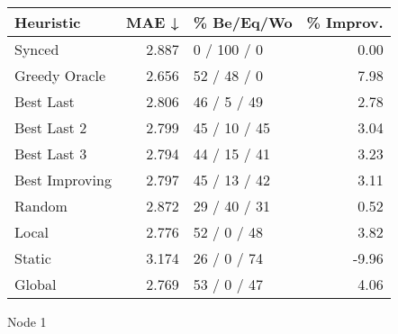 \begin{tabular}{lrlr}
\toprule
\textbf{Heuristic} & \textbf{MAE ↓} & \textbf{\% Be/Eq/Wo} & \textbf{\% Improv.} \\
\midrule
            Synced &          2.887 &          0 / 100 / 0 &                0.00 \\
     Greedy Oracle &          2.656 &          52 / 48 / 0 &                7.98 \\
         Best Last &          2.806 &          46 / 5 / 49 &                2.78 \\
       Best Last 2 &          2.799 &         45 / 10 / 45 &                3.04 \\
       Best Last 3 &          2.794 &         44 / 15 / 41 &                3.23 \\
    Best Improving &          2.797 &         45 / 13 / 42 &                3.11 \\
            Random &          2.872 &         29 / 40 / 31 &                0.52 \\
             Local &          2.776 &          52 / 0 / 48 &                3.82 \\
            Static &          3.174 &          26 / 0 / 74 &               -9.96 \\
            Global &          2.769 &          53 / 0 / 47 &                4.06 \\
\bottomrule
\end{tabular}
\caption{Node 1}
\label{tab:ds_non_lr05_le2_bs2_1}
